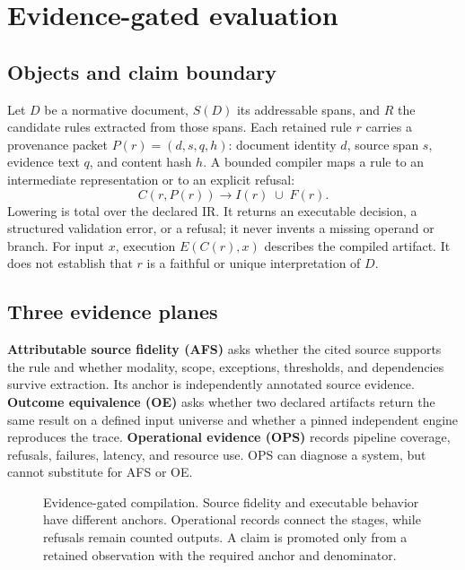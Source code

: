 \section{Evidence-gated evaluation}

\subsection{Objects and claim boundary}

Let $D$ be a normative document, $S(D)$ its addressable spans, and $R$ the
candidate rules extracted from those spans. Each retained rule $r$ carries a
provenance packet $P(r)=(d,s,q,h)$: document identity $d$, source span $s$,
evidence text $q$, and content hash $h$. A bounded compiler maps a rule to an
intermediate representation or to an explicit refusal:
\begin{equation}
  C(r,P(r)) \rightarrow I(r) \;\cup\; F(r).
  \label{eq:compiler}
\end{equation}
Lowering is total over the declared IR. It returns an executable decision, a
structured validation error, or a refusal; it never invents a missing operand
or branch. For input $x$, execution $E(C(r),x)$ describes the compiled
artifact. It does not establish that $r$ is a faithful or unique interpretation
of $D$.

\subsection{Three evidence planes}

\textbf{Attributable source fidelity (AFS)} asks whether the cited source
supports the rule and whether modality, scope, exceptions, thresholds, and
dependencies survive extraction. Its anchor is independently annotated source
evidence. \textbf{Outcome equivalence (OE)} asks whether two declared artifacts
return the same result on a defined input universe and whether a pinned
independent engine reproduces the trace. \textbf{Operational evidence (OPS)}
records pipeline coverage, refusals, failures, latency, and resource use. OPS
can diagnose a system, but cannot substitute for AFS or OE.

\begin{figure}[t]
  \centering
  
  \caption{Evidence-gated compilation. Source fidelity and executable behavior
  have different anchors. Operational records connect the stages, while
  refusals remain counted outputs. A claim is promoted only from a retained
  observation with the required anchor and denominator.}
  \label{fig:measurement-chain}
\end{figure}

